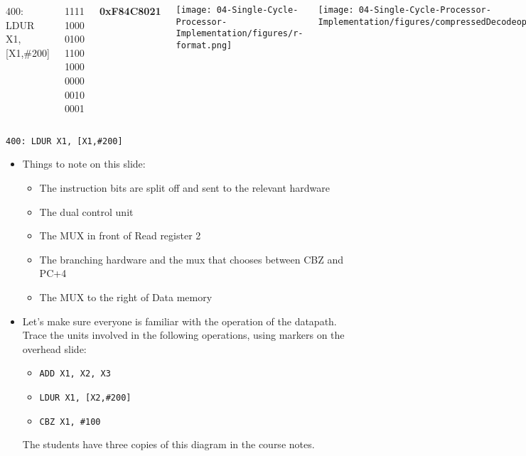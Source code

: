 \begin{frame}[fragile]\ifnum{}
\ifnum{}
\begin{columns}
        {\footnotesize 400: {\color{red}LDUR} {\color{orange}X1}, [{\color{purple}X1},{\color{blue}\#200}]
  
  {\color{red}1111 1000 010}{\color{blue}0 1100 1000} 00{\color{purple}00 001}{\color{orange}0 0001}}

{\footnotesize \textbf{0xF84C8021}}

  \texttt{[image: 04-Single-Cycle-Processor-Implementation/figures/r-format.png]}

  

    \texttt{[image: 04-Single-Cycle-Processor-Implementation/figures/compressedDecodeopcodes.png]}

    \texttt{[image: 04-Single-Cycle-Processor-Implementation/figures/compressedDecodeSignals.png]}

    \vspace{5cm}

\end{columns}
\fi

\ifnum{}
{\tt 400: LDUR X1, [X1,\#200]}

\fi

  \else
\fi

\BNotes\ifnum{}
\begin{itemize}
\item Things to note on this slide:
\begin{itemize}
	\item The instruction bits are split off and sent to the
		relevant hardware
	\item The dual control unit
	\item The MUX in front of Read register 2
	\item The branching hardware and the mux that chooses between
		CBZ and PC+4
	\item The MUX to the right of Data memory
\end{itemize}
\item Let's
make sure everyone is familiar with the operation of the
datapath. Trace the units involved in the following operations, using
markers on the overhead slide:
\begin{itemize}
\item {\tt ADD X1, X2, X3}
\item {\tt LDUR X1, [X2,\#200]}
\item {\tt CBZ X1, \#100}
\end{itemize}
	The students have three copies of this diagram in the course notes.
\end{itemize}
\fi\ENotes
\end{frame}

